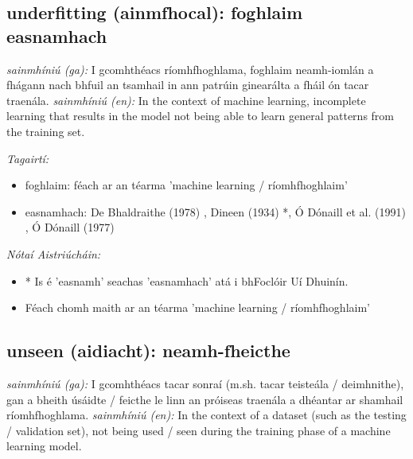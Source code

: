 \documentclass{article}
\begin{document}
\subsection*{underfitting (ainmfhocal): foghlaim easnamhach} 
 \noindent \textit{sainmhíniú (ga):} I gcomhthéacs ríomhfhoghlama, foghlaim neamh-iomlán a fhágann nach bhfuil an tsamhail in ann patrúin ginearálta a fháil ón tacar traenála.
\newline\newline
 \noindent \textit{sainmhíniú (en):} In the context of machine learning, incomplete learning that results in the model not being able to learn general patterns from the training set.
\newline

 \noindent \textit{Tagairtí:}
\begin{itemize}
	\item foghlaim: féach ar an téarma 'machine learning / ríomhfhoghlaim'
	\item easnamhach: De Bhaldraithe (1978) \cite{de-bhaldraithe}, Dineen (1934) \cite{dineen}*, Ó Dónaill et al. (1991) \cite{focloir-beag}, Ó Dónaill (1977) \cite{odonaill}
\end{itemize}

 \noindent \textit{Nótaí Aistriúcháin:}
\begin{itemize}
	\item * Is é 'easnamh' seachas 'easnamhach' atá i bhFoclóir Uí Dhuinín.
	\item Féach chomh maith ar an téarma 'machine learning / ríomhfhoghlaim'
\end{itemize}


\subsection*{unseen (aidiacht): neamh-fheicthe} 
 \noindent \textit{sainmhíniú (ga):} I gcomhthéacs tacar sonraí (m.sh. tacar teisteála / deimhnithe), gan a bheith úsáidte / feicthe le linn an próiseas traenála a dhéantar ar shamhail ríomhfhoghlama.
\newline\newline
 \noindent \textit{sainmhíniú (en):} In the context of a dataset (such as the testing / validation set), not being used / seen during the training phase of a machine learning model.
\newline
\end{document}
